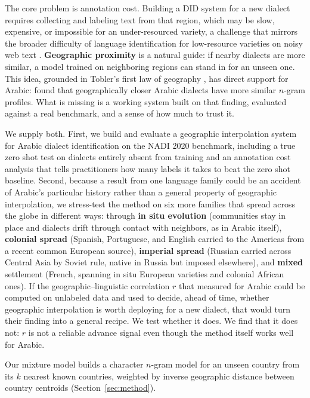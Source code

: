\documentclass[11pt]{article}
\begin{document}
The core problem is annotation cost.
Building a DID system for a new dialect requires collecting and labeling text from that region, which may be slow, expensive, or impossible for an under-resourced variety, a challenge that mirrors the broader difficulty of language identification for low-resource varieties on noisy web text \cite{caswell-etal-2020-language}.
\textbf{Geographic proximity} is a natural guide: if nearby dialects are more similar, a model trained on neighboring regions can stand in for an unseen one.
This idea, grounded in Tobler's first law of geography \cite{nerbonne-heeringa-1997-measuring}, has direct support for Arabic: \citet{alsudais-etal-2022-similarities} found that geographically closer Arabic dialects have more similar $n$-gram profiles.
What is missing is a working system built on that finding, evaluated against a real benchmark, and a sense of how much to trust it.

We supply both.
First, we build and evaluate a geographic interpolation system for Arabic dialect identification on the NADI 2020 benchmark, including a true zero shot test on dialects entirely absent from training and an annotation cost analysis that tells practitioners how many labels it takes to beat the zero shot baseline.
Second, because a result from one language family could be an accident of Arabic's particular history rather than a general property of geographic interpolation, we stress-test the method on six more families that spread across the globe in different ways: through \textbf{in situ evolution} (communities stay in place and dialects drift through contact with neighbors, as in Arabic itself), \textbf{colonial spread} (Spanish, Portuguese, and English carried to the Americas from a recent common European source), \textbf{imperial spread} (Russian carried across Central Asia by Soviet rule, native in Russia but imposed elsewhere), and \textbf{mixed} settlement (French, spanning in situ European varieties and colonial African ones).
If the geographic--linguistic correlation $r$ that \citet{alsudais-etal-2022-similarities} measured for Arabic could be computed on unlabeled data and used to decide, ahead of time, whether geographic interpolation is worth deploying for a new dialect, that would turn their finding into a general recipe.
We test whether it does.
We find that it does not: $r$ is not a reliable advance signal even though the method itself works well for Arabic.

Our mixture model builds a character $n$-gram model for an unseen country from its $k$ nearest known countries, weighted by inverse geographic distance between country centroids (Section~\ref{sec:method}).
\end{document}
